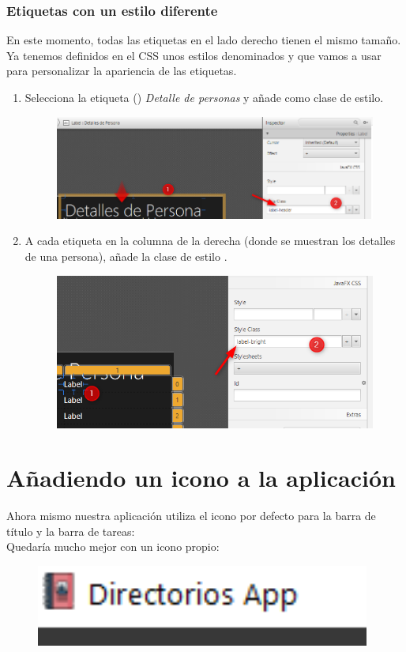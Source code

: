 \subsubsection*{Etiquetas con un estilo diferente}
En este momento, todas las etiquetas en el lado derecho tienen el mismo tamaño. 
Ya tenemos definidos en el CSS unos estilos denominados  y  
que vamos a usar para personalizar la apariencia de las etiquetas.
\begin{enumerate}
    \item Selecciona la etiqueta () \textit{Detalle de personas} y añade  
    como clase de estilo.
    \begin{figure}[H]
        \includegraphics{img/6-9-DetallePerson.png}
    \end{figure}
    \item A cada etiqueta en la columna de la derecha (donde se muestran los detalles 
    de una persona), añade la clase de estilo .
    \begin{figure}[H]
        \includegraphics{img/6-10-labelBright.png}
    \end{figure}
\end{enumerate}

\section{Añadiendo un icono a la aplicación}
Ahora mismo nuestra aplicación utiliza el icono por defecto para la barra de título y la barra de tareas:\\
Quedaría mucho mejor con un icono propio:\\
\begin{figure}[H]
	\includegraphics[width=11cm]{img/6-11-icono.png}
\end{figure}
